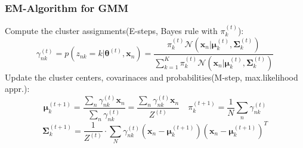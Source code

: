 \subsubsection{EM-Algorithm for GMM}
Compute the cluster assignments(E-steps, Bayes rule with \(\pi_k^{(t)}\)):
\[
\gamma_{nk}^{(t)} = p\left(z_{nk} = k|\mathbf{\theta}^{(t)},\mathbf{x}_n\right) = \frac{\pi_k^{(t)}\mathcal{N}\left(\mathbf{x}_n|\mathbf{\mu}_k^{(t)},\mathbf{\Sigma}_k^{(t)}\right)}{\sum_{k = 1}^{K}\pi_k^{(t)}\mathcal{N}\left(\mathbf{x}_n|\mathbf{\mu}_k^{(t)},\mathbf{\Sigma}_k^{(t)}\right)}
\]
Update the cluster centers, covarinaces and probabilities(M-step, max.likelihood appr.):
\[
\mathbf{\mu}_k^{(t+1)} = \frac{\sum_n \gamma_{nk}^{(t)}\mathbf{x}_n}{\sum_{n} \gamma_{nk}^{(t)}} = \frac{\sum_n \gamma_{nk}^{(t)}\mathbf{x}_n}{Z^{(t)}} \quad \pi_k^{(t+1)} = \frac{1}{N}\sum_n \gamma_{nk}^{(t)}
\]
\[
\mathbf{\Sigma}_k^{(t+1)} = \frac{1}{Z^{(t)}}\cdot\sum_{N}\gamma_{nk}^{(t)}\left(\mathbf{x}_n - \mathbf{\mu}_k^{(t+1)}\right)\left(\mathbf{x}_n - \mathbf{\mu}_k^{(t+1)}\right)^T
\]